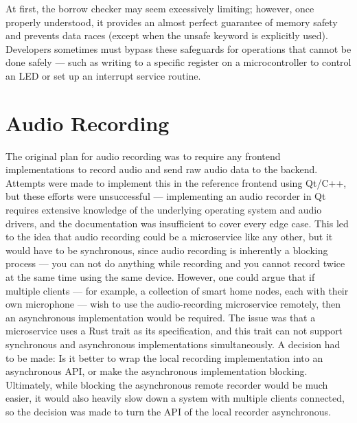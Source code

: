 At first, the borrow checker may seem excessively limiting;
however, once properly understood, it provides an almost perfect guarantee of memory safety
and prevents data races (except when the unsafe keyword is explicitly used).
Developers sometimes must bypass these safeguards for operations that cannot be done safely ---
such as writing to a specific register on a microcontroller to control an LED or set up an interrupt service routine.

\section{Audio Recording}
The original plan for audio recording was to require any frontend implementations to record audio and send raw audio data to the backend.
Attempts were made to implement this in the reference frontend using Qt/C++, but these efforts were unsuccessful ---
implementing an audio recorder in Qt requires extensive knowledge of the underlying operating system and audio drivers,
and the documentation was insufficient to cover every edge case.
This led to the idea that audio recording could be a microservice like any other, but it would have to be synchronous, since audio recording
is inherently a blocking process --- you can not do anything while recording and you cannot record twice at the same time using the same device.
However, one could argue that if multiple clients --- for example, a collection of smart home nodes, each with their own microphone ---
wish to use the audio-recording microservice remotely, then an asynchronous implementation would be required.
The issue was that a microservice uses a Rust trait as its specification, and this trait can not support synchronous and asynchronous implementations simultaneously.
A decision had to be made: Is it better to wrap the local recording implementation into an asynchronous API, or make the asynchronous implementation blocking.
Ultimately, while blocking the asynchronous remote recorder would be much easier, it would also heavily slow down a system with multiple clients connected,
so the decision was made to turn the API of the local recorder asynchronous.

